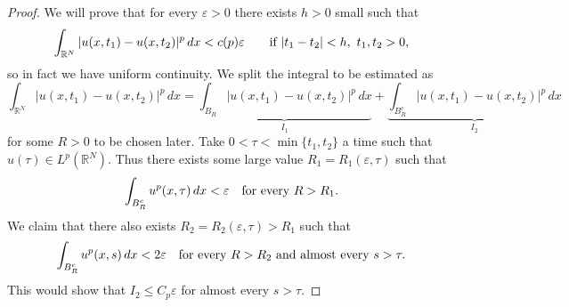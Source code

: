 \documentclass[leqno,12pt]{amsart}
\theoremstyle{definition}
\theoremstyle{remark}
\numberwithin{equation}{section}
\begin{document}
\begin{proof}
We will prove that for every $\varepsilon>0$ there exists $h>0$ small such that
$$
    \int_{\mathbb{R}^N}|u(x,t_1)-u(x,t_2)|^p\,dx< c(p)\varepsilon\qquad \textup{if }|t_1-t_2|<h,\ t_1,t_2>0,
$$
so in fact we have uniform continuity. We split the integral to be estimated as
$$
    \int_{\mathbb{R}^N}|u(x,t_1)-u(x,t_2)|^p\,dx=\underbrace{\int_{B_R}|u(x,t_1)-u(x,t_2)|^p\,dx}_{I_1}+\underbrace{\int_{B^c_R}|u(x,t_1)-u(x,t_2)|^p\,dx}_{I_2}
$$
for some $R>0$ to be chosen later. Take $0<\tau<\min\{t_1,t_2\}$ a time such that $u(\tau)\in L^p(\mathbb{R}^N)$. Thus there exists some large value $R_1=R_1(\varepsilon,\tau)$ such that 
$$
    \int_{B_R^c}u^p(x,\tau)\,dx<\varepsilon\quad\textup{for every }R>R_1.
$$
We claim that  there also exists $R_2=R_2(\varepsilon,\tau)>R_1$ such that
$$
    \int_{B^c_R}u^p(x,s)\,dx<2\varepsilon\quad\textup{for every }R>R_2\textup{ and almost every }s>\tau. 
$$
This would show that $I_2\le C_p \varepsilon$ for almost every $s>\tau$. 


\end{proof}
\end{document}
